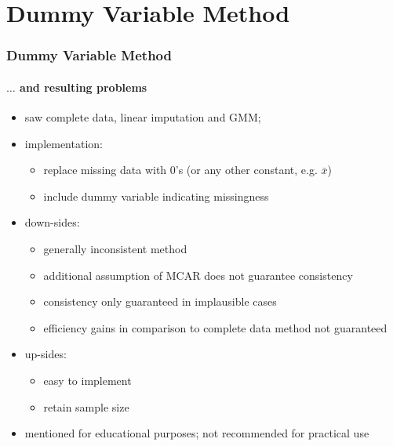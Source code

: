 \documentclass[aspectratio=1610]{beamer}
\begin{document}
\section{Dummy Variable Method}

\begin{frame}
	\frametitle{Dummy Variable Method}
	\framesubtitle{$\ldots$ and resulting problems}
	\begin{itemize}
		\item<1-> saw complete data, linear imputation and GMM;
		\item<2-> implementation:
		\begin{itemize}
			\item<2-> replace missing data with $0$'s (or any other constant, e.g. $\bar{x}$)
			\item<2-> include dummy variable indicating missingness
		\end{itemize}
		\item<3-> down-sides:
		\begin{itemize}
			\item<3-> generally inconsistent method
			\item<3-> additional assumption of MCAR does not guarantee consistency
			\item<3-> consistency only guaranteed in implausible cases
			\item<3-> efficiency gains in comparison to complete data method not guaranteed
		\end{itemize}
		\item<4-> up-sides:
		\begin{itemize}
			\item<4-> easy to implement
			\item<4-> retain sample size
		\end{itemize}
		\item<5-> mentioned for educational purposes; not recommended for practical use
	\end{itemize}
\end{frame}
\end{document}

